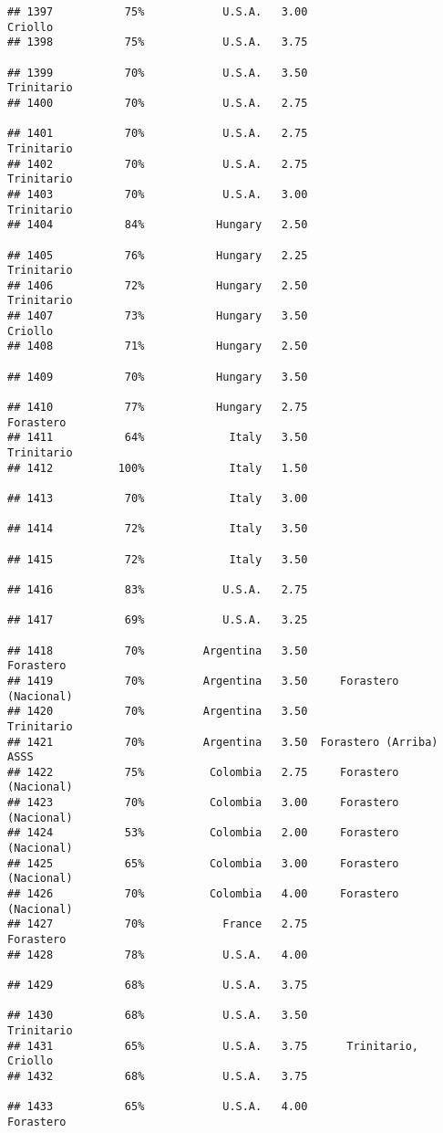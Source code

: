 \documentclass[
]{article}
\begin{document}
\begin{verbatim}
## 1397           75%            U.S.A.   3.00                  Criollo
## 1398           75%            U.S.A.   3.75                         
## 1399           70%            U.S.A.   3.50               Trinitario
## 1400           70%            U.S.A.   2.75                         
## 1401           70%            U.S.A.   2.75               Trinitario
## 1402           70%            U.S.A.   2.75               Trinitario
## 1403           70%            U.S.A.   3.00               Trinitario
## 1404           84%           Hungary   2.50                         
## 1405           76%           Hungary   2.25               Trinitario
## 1406           72%           Hungary   2.50               Trinitario
## 1407           73%           Hungary   3.50                  Criollo
## 1408           71%           Hungary   2.50                         
## 1409           70%           Hungary   3.50                         
## 1410           77%           Hungary   2.75                Forastero
## 1411           64%             Italy   3.50               Trinitario
## 1412          100%             Italy   1.50                         
## 1413           70%             Italy   3.00                         
## 1414           72%             Italy   3.50                         
## 1415           72%             Italy   3.50                         
## 1416           83%            U.S.A.   2.75                         
## 1417           69%            U.S.A.   3.25                         
## 1418           70%         Argentina   3.50                Forastero
## 1419           70%         Argentina   3.50     Forastero (Nacional)
## 1420           70%         Argentina   3.50               Trinitario
## 1421           70%         Argentina   3.50  Forastero (Arriba) ASSS
## 1422           75%          Colombia   2.75     Forastero (Nacional)
## 1423           70%          Colombia   3.00     Forastero (Nacional)
## 1424           53%          Colombia   2.00     Forastero (Nacional)
## 1425           65%          Colombia   3.00     Forastero (Nacional)
## 1426           70%          Colombia   4.00     Forastero (Nacional)
## 1427           70%            France   2.75                Forastero
## 1428           78%            U.S.A.   4.00                         
## 1429           68%            U.S.A.   3.75                         
## 1430           68%            U.S.A.   3.50               Trinitario
## 1431           65%            U.S.A.   3.75      Trinitario, Criollo
## 1432           68%            U.S.A.   3.75                         
## 1433           65%            U.S.A.   4.00                Forastero

\end{verbatim}
\end{document}
